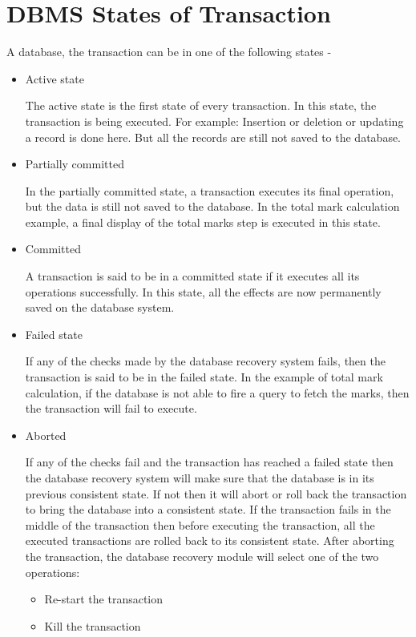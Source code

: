 \documentclass{article}
\begin{document}
\section{DBMS States of Transaction}

A database, the transaction can be in one of the following states -

\begin{itemize}

\item Active state

The active state is the first state of every transaction. In this state, the transaction is being executed.
For example: Insertion or deletion or updating a record is done here. But all the records are still not saved to the database.

\item Partially committed

In the partially committed state, a transaction executes its final operation, but the data is still not saved to the database.
In the total mark calculation example, a final display of the total marks step is executed in this state.

\item Committed

A transaction is said to be in a committed state if it executes all its operations successfully. In this state, all the effects are now permanently saved on the database system.

\item Failed state

If any of the checks made by the database recovery system fails, then the transaction is said to be in the failed state.
In the example of total mark calculation, if the database is not able to fire a query to fetch the marks, then the transaction will fail to execute.

\item Aborted

If any of the checks fail and the transaction has reached a failed state then the database recovery system will make sure that the database is in its previous consistent state. If not then it will abort or roll back the transaction to bring the database into a consistent state.
If the transaction fails in the middle of the transaction then before executing the transaction, all the executed transactions are rolled back to its consistent state.
After aborting the transaction, the database recovery module will select one of the two operations:
\begin{itemize}
\item Re-start the transaction
\item Kill the transaction
\end{itemize}

\end{itemize}
\end{document}
